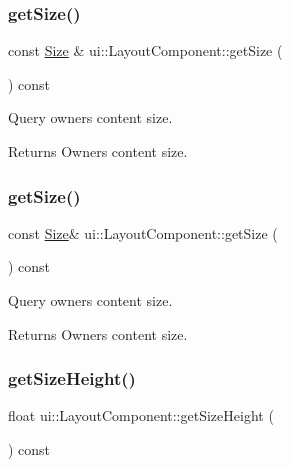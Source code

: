 \subsubsection{\texorpdfstring{get\+Size()}{getSize()}\hspace{0.1cm}{\footnotesize\ttfamily [1/2]}}
{\footnotesize\ttfamily const \hyperlink{classSize}{Size} \& ui\+::\+Layout\+Component\+::get\+Size (\begin{DoxyParamCaption}{ }\end{DoxyParamCaption}) const}

Query owner\textquotesingle{}s content size. \begin{DoxyReturn}{Returns}
Owner\textquotesingle{}s content size. 
\end{DoxyReturn}
\mbox{\label{classui_1_1LayoutComponent_a9705cc41143d6f9a177efb8a8e2838e8}} 
\subsubsection{\texorpdfstring{get\+Size()}{getSize()}\hspace{0.1cm}{\footnotesize\ttfamily [2/2]}}
{\footnotesize\ttfamily const \hyperlink{classSize}{Size}\& ui\+::\+Layout\+Component\+::get\+Size (\begin{DoxyParamCaption}{ }\end{DoxyParamCaption}) const}

Query owner\textquotesingle{}s content size. \begin{DoxyReturn}{Returns}
Owner\textquotesingle{}s content size. 
\end{DoxyReturn}
\mbox{\label{classui_1_1LayoutComponent_aa00a66a58b28af9b2c685f09a0923922}} 
\subsubsection{\texorpdfstring{get\+Size\+Height()}{getSizeHeight()}\hspace{0.1cm}{\footnotesize\ttfamily [1/2]}}
{\footnotesize\ttfamily float ui\+::\+Layout\+Component\+::get\+Size\+Height (\begin{DoxyParamCaption}{ }\end{DoxyParamCaption}) const}

